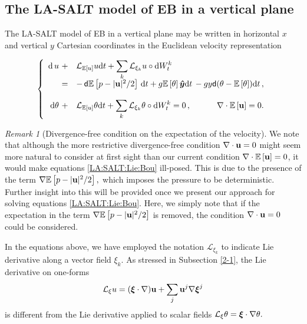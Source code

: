 \documentclass[11pt, oneside]{article}   	%
\numberwithin{equation}{section}
\theoremstyle{plain}
\theoremstyle{definition}
\theoremstyle{remark}
\newtheorem{remark}[theorem]{Remark}
\newcommand{\<}{\langle}
\renewcommand{\>}{\rangle}
\def\diff{\textnormal{d}}
\def\u{{\bf{u}}}
\newcommand{\mb}[1]{\mbox{\boldmath{$#1$}}}
\newcommand{\E}[1]{\mathbb{E}\left[{#1}\right]}
\begin{document}
\subsection*{The LA-SALT model of EB in a vertical plane} 

The LA-SALT model of EB in a vertical plane may be written in horizontal $x$ and vertical $y$ Cartesian coordinates in the Euclidean velocity representation 

\begin{equation}\label{LA:SALT:Lie:Bou}
\left\{
\begin{array}{rl}
{\diff\,}{u}\ +& \mathcal L_{\mathbb E[u]} {u} \diff t + \displaystyle \displaystyle\sum_k \mathcal L_{\xi_k} {u} \circ \diff W_t^k 
\\=& - \,{\sf{d}} \E{ p -  |\u|^2/2 }\, \diff t + g \E{\theta} \mb{\hat{y}} \diff t
\,- gy {\sf{d}} (\theta - \E{\theta}) \diff t
\,,\\ \\
\diff \theta\ +& \mathcal L_{\mathbb E[u]} {\theta} \diff t + \displaystyle \displaystyle\sum_k \mathcal L_{\xi_k} {\theta} \circ \diff W_t^k = 0
\,,\hfill \nabla \cdot \mathbb{E} \left[ \u \right]=0.
\end{array}
\right.
\end{equation}
\begin{remark}[Divergence-free condition on the expectation of the velocity] We note that although the more restrictive divergence-free condition $\nabla \cdot \u = 0$ might seem more natural to consider at first sight than our current condition $\nabla \cdot \mathbb{E} \left[ \u \right]=0$, it would make equations \eqref{LA:SALT:Lie:Bou} ill-posed. This is due to the presence of the term $\nabla \E{ p -  |\u|^2/2 },$ which imposes the pressure to be deterministic. Further insight into this will be provided once we present our approach for solving equations \eqref{LA:SALT:Lie:Bou}. Here, we simply note that if the expectation in the term $\nabla \E{ p -  |\u|^2/2 }$ is removed, the condition $\nabla \cdot \u = 0$ could be considered.


\end{remark}
In the equations above, we have employed the notation $\mathcal{L}_{\xi_k}$ to indicate Lie derivative along a vector field $\xi_k$. As stressed in Subsection \ref{2-1}, the Lie derivative on one-forms 
\[
\mathcal{L}_{\xi} u = (\mb{\xi} \cdot \nabla) \u + \displaystyle\sum_{j} \u^j \nabla {\mb \xi}^j
\]
is different from the Lie derivative applied to scalar fields $\mathcal{L}_{\xi} \theta = \mb{\xi} \cdot \nabla \theta.$ 
\end{document}
